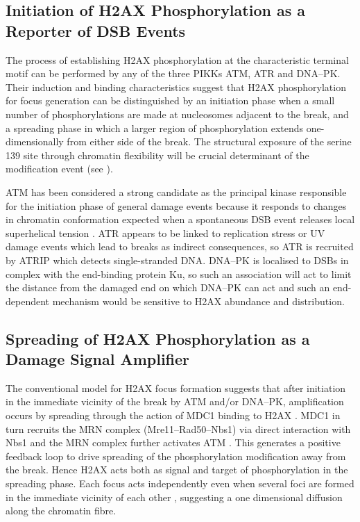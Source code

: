 \subsection{Initiation of H2AX Phosphorylation as a Reporter of DSB Events}
The process of establishing H2AX phosphorylation at the characteristic
terminal motif can be performed by any of the three PIKKs ATM, ATR and
DNA--PK\@. Their induction and binding characteristics suggest that
H2AX phosphorylation for focus generation can be distinguished by an
initiation phase when a small number of phosphorylations are made at
nucleosomes adjacent to the break, and a spreading phase in which a
larger region of phosphorylation extends one-dimensionally from either
side of the break.
The structural exposure of the serine 139 site through chromatin
flexibility will be crucial determinant of the modification event (see
).

ATM has been considered a strong candidate as the principal kinase
responsible for the initiation phase of general damage events because
it responds to changes in chromatin conformation expected when a
spontaneous DSB event releases local superhelical tension
\citep{CJB03}. ATR appears to be linked to replication stress or UV
damage events which lead to breaks as indirect consequences, so ATR is
recruited by ATRIP which detects single-stranded DNA\@. DNA--PK is
localised to DSBs in complex with the end-binding protein Ku, so such
an association will act to limit the distance from the damaged end on
which DNA--PK can act \citep{WCG01} and such an end-dependent
mechanism would be sensitive to H2AX abundance and distribution.

\subsection{Spreading of H2AX Phosphorylation as a Damage Signal Amplifier}
The conventional model for \textgamma H2AX focus formation suggests
that after initiation in the immediate vicinity of the break by ATM
and/or DNA--PK, amplification occurs by spreading through the action
of MDC1 binding to \textgamma H2AX \citep{MSJAC+05}. MDC1 in turn
recruits the MRN complex (Mre11--Rad50--Nbs1) via direct interaction
with Nbs1 \citep{LMS+04} and the MRN complex further activates ATM
\citep{ULM+03}. This generates a positive feedback loop to drive
spreading of the phosphorylation modification away from the
break. Hence H2AX acts both as signal and target of phosphorylation in
the spreading phase. Each focus acts independently even when several
foci are formed in the immediate vicinity of each other
\citep{MJK+06}, suggesting a one dimensional diffusion along the
chromatin fibre.

